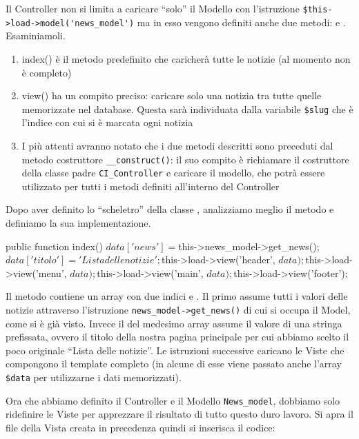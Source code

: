 Il Controller non si limita a caricare ``solo'' il Modello con l'istruzione \verb|$this->load->model('news_model')| ma in esso vengono definiti anche due metodi:  e . Esaminiamoli.

\begin{enumerate}
\item index() è il metodo predefinito che caricherà tutte le notizie (al momento non è completo)
\item view() ha un compito preciso: caricare solo una notizia tra tutte quelle memorizzate nel database. Questa sarà individuata dalla variabile \verb|$slug| che è l'indice con cui si è marcata ogni notizia
\item I più attenti avranno notato che i due metodi descritti sono preceduti dal metodo costruttore \verb|__construct()|: il suo compito è richiamare il costruttore della classe padre \verb|CI_Controller| e caricare il modello, che potrà essere utilizzato per tutti i metodi definiti all'interno del Controller
\end{enumerate}

Dopo aver definito lo ``scheletro'' della classe , analizziamo meglio il metodo  e definiamo la sua implementazione.

\begin{code}
public function index()
{
	$data['news'] = $this->news_model->get_news();
	$data['titolo'] = 'Lista delle notizie';

	$this->load->view('header', $data);
	$this->load->view('menu', $data);
	$this->load->view('main', $data);
	$this->load->view('footer');
}
\end{code}

Il metodo contiene un array  con due indici  e . Il primo assume tutti i valori delle notizie attraverso l'istruzione \verb|news_model->get_news()| di cui si occupa il Model, come si è già visto. Invece il  del medesimo array assume il valore di una stringa prefissata, ovvero il titolo della nostra pagina principale per cui abbiamo scelto il poco originale ``Lista delle notizie''. Le istruzioni successive caricano le Viste che compongono il template completo (in alcune di esse viene passato anche l'array \verb|$data| per utilizzarne i dati memorizzati).

Ora che abbiamo definito il Controller e il Modello \verb|News_model|, dobbiamo solo ridefinire le Viste per apprezzare il risultato di tutto questo duro lavoro. Si apra il file della Vista creata in precedenza  quindi si inserisca il codice:

